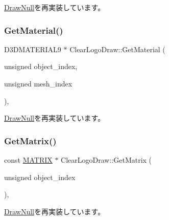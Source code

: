 \mbox{\hyperlink{class_draw_null_a8496ed1b1f765a331a8f1704122b8ca4}{Draw\+Null}}を再実装しています。

\mbox{\label{class_clear_logo_draw_ab356bf5d56c10a6689e101b35c30d889}} 
\subsubsection{\texorpdfstring{Get\+Material()}{GetMaterial()}}
{\footnotesize\ttfamily D3\+D\+M\+A\+T\+E\+R\+I\+A\+L9 $\ast$ Clear\+Logo\+Draw\+::\+Get\+Material (\begin{DoxyParamCaption}\item[{unsigned}]{object\+\_\+index,  }\item[{unsigned}]{mesh\+\_\+index }\end{DoxyParamCaption})\hspace{0.3cm}{\ttfamily [override]}, {\ttfamily [virtual]}}



\mbox{\hyperlink{class_draw_null_a84969d22d3436986f214e9896fe44fc6}{Draw\+Null}}を再実装しています。

\mbox{\label{class_clear_logo_draw_af5d12b717020101e5c956cf3574f0e2a}} 
\subsubsection{\texorpdfstring{Get\+Matrix()}{GetMatrix()}}
{\footnotesize\ttfamily const \mbox{\hyperlink{_vector3_d_8h_a032295cd9fb1b711757c90667278e744}{M\+A\+T\+R\+IX}} $\ast$ Clear\+Logo\+Draw\+::\+Get\+Matrix (\begin{DoxyParamCaption}\item[{unsigned}]{object\+\_\+index }\end{DoxyParamCaption})\hspace{0.3cm}{\ttfamily [override]}, {\ttfamily [virtual]}}



\mbox{\hyperlink{class_draw_null_adede079e9c11a756090740b20bb43022}{Draw\+Null}}を再実装しています。

\mbox{\label{class_clear_logo_draw_a99aba47b4693f15498daf7df2bfee2d7}} 

